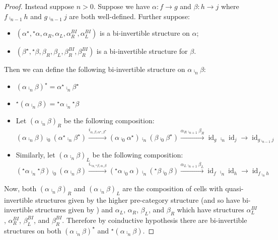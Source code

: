 \documentclass{article}
\DeclareMathOperator{\id}{id}
\newcommand{\linv}[1]{{}^\star\!#1} \newcommand{\rinv}[1]{#1^\star}
\begin{document}
\begin{proof}
    Instead suppose \(n > 0\). Suppose we have \(\alpha: f \to g\) and \(\beta: h
    \to j\) where \(f \comp_{n-1} h\) and \(g \comp_{n-1} j\) are both
    well-defined. Further suppose:
    \begin{itemize}
    \item \((\rinv \alpha, \linv \alpha, \alpha_R, \alpha_L,
      \alpha_R^{BI}, \alpha_L^{BI})\) is a bi-invertible structure on
      \(\alpha\);
    \item \((\rinv \beta, \linv \beta, \beta_R, \beta_L, \beta_R^{BI},
      \beta_R^{BI})\) is a bi-invertible structure for \(\beta\).
    \end{itemize}
    Then we can define the following bi-invertible structure on
    \(\alpha \comp_n \beta\):
    \begin{itemize}
    \item \(\rinv {(\alpha \comp_n \beta)} = \rinv \alpha \comp_n
      \rinv \beta\)
    \item \(\linv {(\alpha \comp_n \beta)} = \linv \alpha \comp_n
      \linv \beta\)
    \item Let \({(\alpha \comp_n \beta)}_R\) be the following
      composition:
      \begin{equation*}
        (\alpha \comp_n \beta) \comp_0 (\rinv \alpha \comp_n \rinv \beta) \overset {i_{\alpha,\beta,\rinv \alpha, \rinv \beta}} \to (\alpha \comp_0 \rinv \alpha) \comp_n (\beta \comp_0 \rinv \beta) \overset {\alpha_R \comp_{n+1} \beta_R} \to \id_g \comp_n \id_j \to \id_{g \comp_{n-1} j}
      \end{equation*}
    \item Similarly, let \({(\alpha \comp_n \beta)}_L\) be the
      following composition:
      \begin{equation*}
        (\linv \alpha \comp_n \linv \beta) \comp_0 (\alpha \comp_n \beta) \overset {i_{\linv \alpha, \linv \beta, \alpha, \beta}} \to (\linv \alpha \comp_0 \alpha) \comp_n (\linv \beta \comp_0 \beta) \overset {\alpha _L \comp_{n+1} \beta _L} \to \id_f \comp_n \id_h \to \id_{f \comp_n h}
      \end{equation*}
    \end{itemize}
    Now, both \({(\alpha \comp_n \beta)}_R\) and \({(\alpha \comp_n
      \beta)}_L\) are the composition of cells with quasi-invertible
    structures given by the higher pre-category structure (and so have
    bi-invertible structures given by ) and
    \(\alpha_L\), \(\alpha_R\), \(\beta_L\), and \(\beta_R\) which
    have structures \(\alpha_L^{BI}\), \(\alpha_R^{BI}\),
    \(\beta_L^{BI}\), and \(\beta_R^{BI}\). Therefore by coinductive
    hypothesis there are bi-invertible structures on both \(\rinv {(\alpha \comp_n \beta)}\) and \(\linv {(\alpha \comp_n \beta)}\).
\end{proof}
\end{document}
